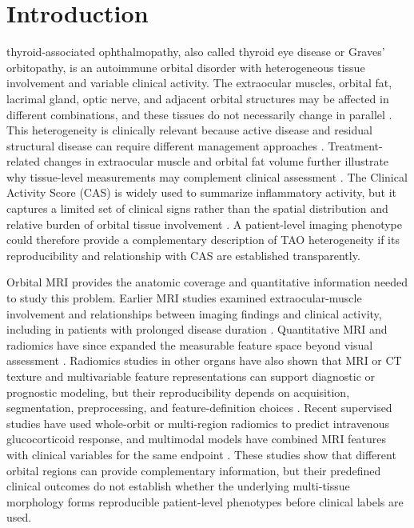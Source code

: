 \documentclass[utf8]{FrontiersinVancouver}
\newcommand{\TAO}{thyroid-associated ophthalmopathy}
\begin{document}
\section{Introduction}
\TAO, also called thyroid eye disease or Graves' orbitopathy, is an autoimmune orbital disorder with heterogeneous tissue involvement and variable clinical activity. The extraocular muscles, orbital fat, lacrimal gland, optic nerve, and adjacent orbital structures may be affected in different combinations, and these tissues do not necessarily change in parallel \citep{bahn2010,taylor2020}. This heterogeneity is clinically relevant because active disease and residual structural disease can require different management approaches \citep{bartalena2021,douglas2020}. Treatment-related changes in extraocular muscle and orbital fat volume further illustrate why tissue-level measurements may complement clinical assessment \citep{jain2022}. The Clinical Activity Score (CAS) is widely used to summarize inflammatory activity, but it captures a limited set of clinical signs rather than the spatial distribution and relative burden of orbital tissue involvement \citep{mourits1997}. A patient-level imaging phenotype could therefore provide a complementary description of TAO heterogeneity if its reproducibility and relationship with CAS are established transparently.

Orbital MRI provides the anatomic coverage and quantitative information needed to study this problem. Earlier MRI studies examined extraocular-muscle involvement and relationships between imaging findings and clinical activity, including in patients with prolonged disease duration \citep{yokoyama2002,tortora2013,zhou2019,huo2022}. Quantitative MRI and radiomics have since expanded the measurable feature space beyond visual assessment \citep{zhang2024,wang2025,lambin2012,gillies2016,yip2016}. Radiomics studies in other organs have also shown that MRI or CT texture and multivariable feature representations can support diagnostic or prognostic modeling, but their reproducibility depends on acquisition, segmentation, preprocessing, and feature-definition choices \citep{yi2018adrenal,yang2025mri,he2025prior}. Recent supervised studies have used whole-orbit or multi-region radiomics to predict intravenous glucocorticoid response, and multimodal models have combined MRI features with clinical variables for the same endpoint \citep{zhang2024response,zhou2026response}. These studies show that different orbital regions can provide complementary information, but their predefined clinical outcomes do not establish whether the underlying multi-tissue morphology forms reproducible patient-level phenotypes before clinical labels are used.
\end{document}
